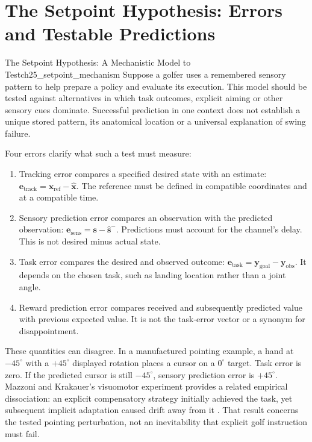 \section{The Setpoint Hypothesis: Errors and Testable Predictions}
\label{sec:ch25_setpoint_mechanism}

\begin{principle}{The Setpoint Hypothesis: A Mechanistic Model to Test}{ch25_setpoint_mechanism}
\label{thm:ch25_setpoint}
Suppose a golfer uses a remembered sensory pattern to help prepare a policy and evaluate its execution. This model should be tested against alternatives in which task outcomes, explicit aiming or other sensory cues dominate. Successful prediction in one context does not establish a unique stored pattern, its anatomical location or a universal explanation of swing failure.
\end{principle}

Four errors clarify what such a test must measure:
\begin{enumerate}
\item Tracking error compares a specified desired state with an estimate: $\bm{e}_{\mathrm{track}}=\bm{x}_{\mathrm{ref}}-\hat{\bm{x}}$. The reference must be defined in compatible coordinates and at a compatible time.
\item Sensory prediction error compares an observation with the predicted observation: $\bm{e}_{\mathrm{sens}}=\bm{s}-\hat{\bm{s}}^-$. Predictions must account for the channel's delay. This is not desired minus actual state.
\item Task error compares the desired and observed outcome: $\bm{e}_{\mathrm{task}}=\bm{y}_{\mathrm{goal}}-\bm{y}_{\mathrm{obs}}$. It depends on the chosen task, such as landing location rather than a joint angle.
\item Reward prediction error compares received and subsequently predicted value with previous expected value. It is not the task-error vector or a synonym for disappointment.
\end{enumerate}

These quantities can disagree. In a manufactured pointing example, a hand at $-45^\circ$ with a $+45^\circ$ displayed rotation places a cursor on a $0^\circ$ target. Task error is zero. If the predicted cursor is still $-45^\circ$, sensory prediction error is $+45^\circ$. Mazzoni and Krakauer's visuomotor experiment provides a related empirical dissociation: an explicit compensatory strategy initially achieved the task, yet subsequent implicit adaptation caused drift away from it \citep{Mazzoni2006Strategy}. That result concerns the tested pointing perturbation, not an inevitability that explicit golf instruction must fail.

